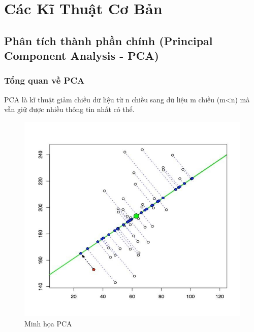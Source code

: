\documentclass[a4paper, 12pt]{article}
\begin{document}
\section{Các Kĩ Thuật Cơ Bản}
\subsection{Phân tích thành phần chính (Principal Component Analysis - PCA)}
\subsubsection{Tổng quan về PCA}

PCA là kĩ thuật giảm chiều dữ liệu từ n chiều sang dữ liệu m chiều (m<n) mà vẫn giữ được nhiều thông tin nhất có thể.
\begin{figure}[H]
    \begin{center}
        \includegraphics[scale=0.5]{img/PCA-example}
        \caption{Minh họa PCA}
    \end{center}
\end{figure}
\end{document}
